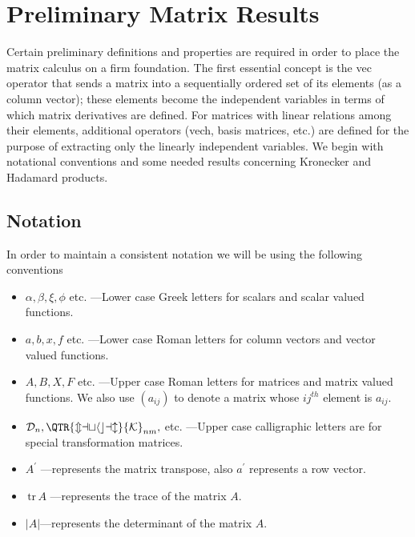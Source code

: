 \documentclass[12pt,thmsa,suthesis,verbatim]{report}
\begin{document}
\section{Preliminary Matrix Results}

Certain preliminary definitions and properties are required in order to
place the matrix calculus on a firm foundation. The first essential concept
is the vec operator that sends a matrix into a sequentially ordered set of
its elements (as a column vector); these elements become the independent
variables in terms of which matrix derivatives are defined. For matrices
with linear relations among their elements, additional operators (vech,
basis matrices, etc.) are defined for the purpose of extracting only the
linearly independent variables. We begin with notational conventions and
some needed results concerning Kronecker and Hadamard products.

\subsection{Notation}

In order to maintain a consistent notation we will be using the following
conventions

\begin{itemize}
\item  $\alpha ,\beta ,\xi ,\phi $ etc. ---Lower case Greek letters for
scalars and scalar valued functions.

\item  $a,b,x,f$ etc. ---Lower case Roman letters for column vectors and
vector valued functions.

\item  $A,B,X,F$ etc. ---Upper case Roman letters for matrices and matrix
valued functions. We also use $\left( a_{ij}\right) $ to denote a matrix
whose $ij^{th}$ element is $a_{ij}$.

\item  $\mathcal{D}_n,\mathcal{\QTR{mathcal}{K}}_{nm},$ etc. ---Upper case
calligraphic letters are for special transformation matrices.

\item  $A^{\prime }$ ---represents the matrix transpose, also $a^{\prime }$
represents a row vector.

\item  $\,\mathrm{tr}\,A$ ---represents the trace of the matrix $A.$

\item  $\left| A\right| $---represents the determinant of the matrix $A.$
\end{itemize}
\end{document}
